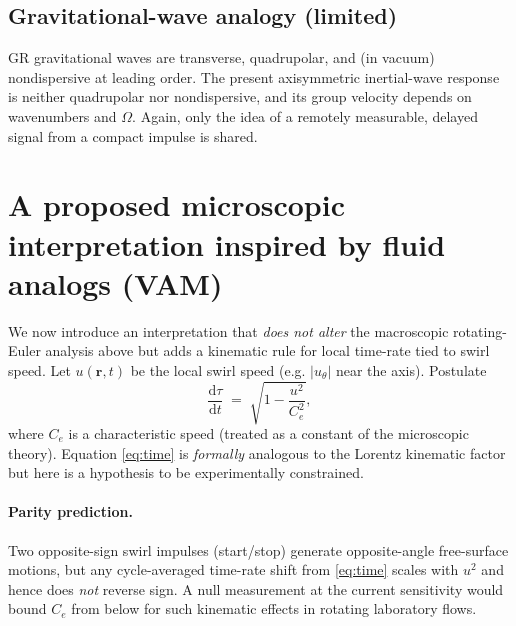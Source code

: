 \documentclass[12pt]{article}
\newcommand{\dd}{\mathrm{d}}
\newcommand{\Om}{\Omega}
\newcommand{\br}{\boldsymbol{r}}
\newcommand{\Ce}{C_e} %
\begin{document}
\subsection*{Gravitational-wave analogy (limited)}
GR gravitational waves are transverse, quadrupolar, and (in vacuum) nondispersive at leading order. The present axisymmetric inertial-wave response is neither quadrupolar nor nondispersive, and its group velocity depends on wavenumbers and $\Om$. Again, only the idea of a remotely measurable, delayed signal from a compact impulse is shared.

\section{A proposed microscopic interpretation inspired by fluid analogs (VAM)}
We now introduce an interpretation that \emph{does not alter} the macroscopic rotating-Euler analysis above but adds a kinematic rule for local time-rate tied to swirl speed. Let $u(\br,t)$ be the local swirl speed (e.g. $|u_\theta|$ near the axis). Postulate
\begin{equation}
\frac{\dd \tau}{\dd t} \;=\; \sqrt{1-\frac{u^2}{\Ce^2}}, 
\label{eq:time}
\end{equation}
where $\Ce$ is a characteristic speed (treated as a constant of the microscopic theory). Equation \eqref{eq:time} is \emph{formally} analogous to the Lorentz kinematic factor but here is a hypothesis to be experimentally constrained. 

\paragraph{Parity prediction.}
Two opposite-sign swirl impulses (start/stop) generate opposite-angle free-surface motions, but any cycle-averaged time-rate shift from \eqref{eq:time} scales with $u^2$ and hence does \emph{not} reverse sign. A null measurement at the current sensitivity would bound $\Ce$ from below for such kinematic effects in rotating laboratory flows.
\end{document}
